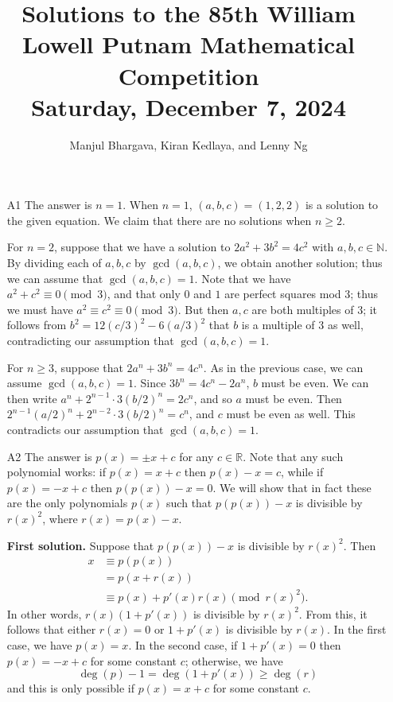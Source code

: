 \documentclass[amssymb,twocolumn,pra,10pt,aps]{revtex4-1}
\begin{document}
\title{Solutions to the 85th William Lowell Putnam Mathematical Competition \\
    Saturday, December 7, 2024}
\author{Manjul Bhargava, Kiran Kedlaya, and Lenny Ng}
\noaffiliation
\maketitle

\begin{itemize}
\item[A1]
The answer is $n=1$. When $n=1$, $(a,b,c) = (1,2,2)$ is a solution to the given equation. We claim that there are no solutions when $n \geq 2$.

For $n = 2$, suppose that we have a solution to $2a^2+3b^2=4c^2$ with $a,b,c\in\mathbb{N}$. By dividing each of $a,b,c$ by $\gcd(a,b,c)$, we obtain another solution; thus we can assume that $\gcd(a,b,c) = 1$. Note that we have $a^2+c^2 \equiv 0 \pmod{3}$, and that only $0$ and $1$ are perfect squares mod $3$; thus we must have $a^2 \equiv c^2 \equiv 0 \pmod{3}$. But then $a,c$ are both multiples of $3$; it follows from $b^2 = 12(c/3)^2-6(a/3)^2$ that $b$ is a multiple of $3$ as well, contradicting our assumption that $\gcd(a,b,c)=1$.

For $n \geq 3$, suppose that $2a^n+3b^n=4c^n$. As in the previous case, we can assume $\gcd(a,b,c)=1$. Since $3b^n=4c^n-2a^n$, $b$ must be even. 
We can then write $a^n+2^{n-1}\cdot 3(b/2)^n = 2 c^n$, and so $a$ must be even. Then $2^{n-1}(a/2)^n+2^{n-2} \cdot 3(b/2)^n = c^n$, and $c$ must be even as well. This contradicts our assumption that $\gcd(a,b,c)=1$.

\item[A2]
The answer is $p(x) = \pm x+c$ for any $c \in \mathbb{R}$. Note that any such polynomial works: if $p(x)=x+c$ then $p(x)-x=c$, while if $p(x)=-x+c$ then $p(p(x))-x=0$.
We will show that in fact these are the only polynomials $p(x)$ such that $p(p(x))-x$ is divisible by $r(x)^2$, where $r(x)=p(x)-x$. 

\noindent
\textbf{First solution.}
Suppose that $p(p(x))-x$ is divisible by $r(x)^2$. Then
\begin{align*}
x &\equiv p(p(x)) \\
&= p(x + r(x)) \\
&\equiv p(x) + p'(x) r(x) \pmod{r(x)^2}.
\end{align*}
In other words, $r(x) (1 + p'(x))$ is divisible by $r(x)^2$.
From this, it follows that either $r(x) = 0$ or $1+p'(x)$ is divisible by $r(x)$.
In the first case, we have $p(x) = x$.
In the second case, if $1 + p'(x) = 0$ then $p(x) = -x + c$ for some constant $c$;
otherwise, we have
\[
\deg(p) - 1 = \deg(1 + p'(x)) \geq \deg(r)
\]
and this is only possible if $p(x) = x + c$ for some constant $c$.


\end{itemize}
\end{document}
